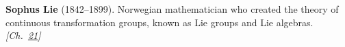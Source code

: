\textbf{Sophus Lie} (1842–1899). Norwegian mathematician who created the theory of continuous transformation groups, known as Lie groups and Lie algebras. \emph{[Ch.~\hyperref[ch:exponentialmapslietheory]{21}]}

